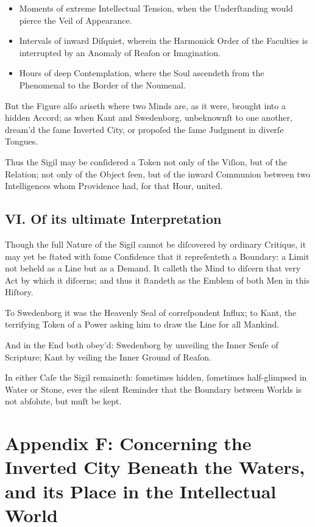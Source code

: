 \documentclass[12pt]{article}
\begin{document}
\begin{itemize}
    \item Moments of extreme Intellectual Tension, when the Underſtanding would 
          pierce the Veil of Appearance.
    \item Intervals of inward Diſquiet, wherein the Harmonick Order of the 
          Faculties is interrupted by an Anomaly of Reaſon or Imagination.
    \item Hours of deep Contemplation, where the Soul ascendeth from the 
          Phenomenal to the Border of the Noumenal.
\end{itemize}

But the Figure alſo ariseth where two Minds are, as it were, brought into a 
hidden Accord; as when Kant and Swedenborg, unbeknownſt to one another, dream’d 
the ſame Inverted City, or propoſed the ſame Judgment in diverſe Tongues.

Thus the Sigil may be conſidered a Token not only of the Viſion, but of the 
Relation; not only of the Object ſeen, but of the inward Communion between 
two Intelligences whom Providence had, for that Hour, united.

\subsection*{VI. Of its ultimate Interpretation}
Though the full Nature of the Sigil cannot be diſcovered by ordinary 
Critique, it may yet be ſtated with ſome Confidence that it repreſenteth a 
Boundary: a Limit not beheld as a Line but as a Demand. It calleth the Mind 
to diſcern that very Act by which it diſcerns; and thus it ſtandeth as the 
Emblem of both Men in this Hiſtory.

To Swedenborg it was the Heavenly Seal of correſpondent Influx;  
to Kant, the terrifying Token of a Power asking him to draw the Line for all 
Mankind.

And in the End both obey’d: Swedenborg by unveiling the Inner Senſe of 
Scripture; Kant by veiling the Inner Ground of Reaſon.

In either Caſe the Sigil remaineth: ſometimes hidden, ſometimes half-glimpsed 
in Water or Stone, ever the silent Reminder that the Boundary between Worlds 
is not abſolute, but muſt be kept.

\newpage

\section*{Appendix F: Concerning the Inverted City Beneath the Waters, and its Place in the Intellectual World}
\end{document}
